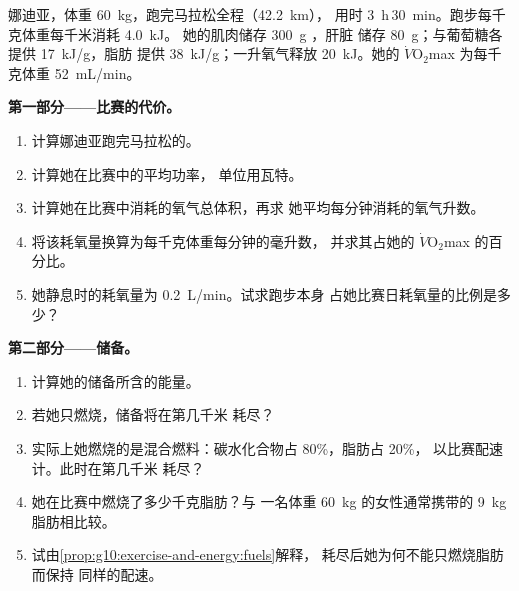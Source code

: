 \begin{problem}
\label{pb:g10:exercise-and-energy:1}
娜迪亚，体重 \qty{60}{kg}，跑完马拉松全程（\qty{42.2}{km}），
用时 \qty{3}{h}\,\qty{30}{min}。跑步每千克体重每千米消耗 \qty{4.0}{kJ}。
她的肌肉储存 \qty{300}{g} ，肝脏
储存 \qty{80}{g}；与葡萄糖各提供 \qty{17}{kJ/g}，脂肪
提供 \qty{38}{kJ/g}；一升氧气释放 \qty{20}{kJ}。她的
$\dot V\!\mathrm{O_2}$max 为每千克体重 \qty{52}{mL/min}。

\medskip
\noindent\textbf{第一部分——比赛的代价。}
\begin{enumerate}
  \item 计算娜迪亚跑完马拉松的。
  \item 计算她在比赛中的平均功率，
        单位用瓦特。
  \item 计算她在比赛中消耗的氧气总体积，再求
        她平均每分钟消耗的氧气升数。
  \item 将该耗氧量换算为每千克体重每分钟的毫升数，
        并求其占她的
        $\dot V\!\mathrm{O_2}$max 的百分比。
  \item 她静息时的耗氧量为 \qty{0.2}{L/min}。试求跑步本身
        占她比赛日耗氧量的比例是多少？
\end{enumerate}

\medskip
\noindent\textbf{第二部分——储备。}
\begin{enumerate}[resume]
  \item 计算她的储备所含的能量。
  \item 若她只燃烧，储备将在第几千米
        耗尽？
  \item 实际上她燃烧的是混合燃料：碳水化合物占 80\%，脂肪占 20\%，
        以比赛配速计。此时在第几千米
        耗尽？
  \item 她在比赛中燃烧了多少千克脂肪？与
        一名体重 \qty{60}{kg} 的女性通常携带的 \qty{9}{kg} 脂肪相比较。
  \item 试由\cref{prop:g10:exercise-and-energy:fuels}解释，
        耗尽后她为何不能只燃烧脂肪而保持
        同样的配速。
\end{enumerate}


\end{problem}
